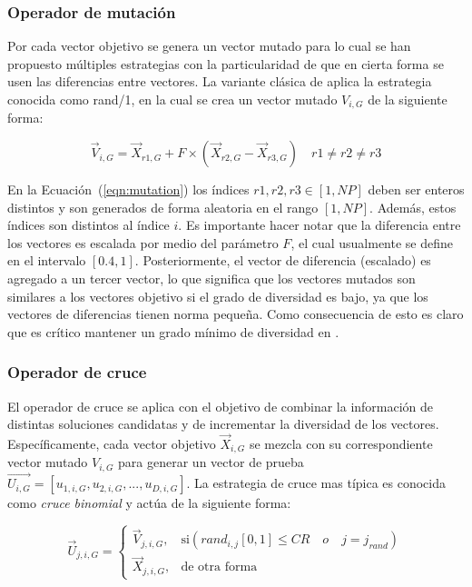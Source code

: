 \subsubsection{Operador de mutación}

Por cada vector objetivo se genera un vector mutado para lo cual se han propuesto múltiples estrategias con la particularidad de que en cierta forma
se usen las diferencias entre vectores.
%
La variante clásica de \DE{} aplica la estrategia conocida como rand/1, en la cual se crea un vector mutado $V_{i,G}$ de la siguiente forma:

\begin{equation}\label{eqn:mutation}
\vec{V}_{i,G} = \vec{X}_{r1, G} + F \times (\vec{X}_{r2, G} - \vec{X}_{r3, G}) \quad r1 \neq r2 \neq r3
\end{equation}

En la Ecuación~(\ref{eqn:mutation}) los índices $r1, r2, r3 \in [1,NP]$ deben ser enteros distintos y son generados de forma aleatoria
en el rango $[1, NP]$.
%
Además, estos índices son distintos al índice $i$.
%
Es importante hacer notar que la diferencia entre los vectores es escalada por medio del parámetro $F$, el cual usualmente se define en el intervalo $[0.4, 1]$.
%
Posteriormente, el vector de diferencia (escalado) es agregado a un tercer vector, lo que significa que
los vectores mutados son similares a los vectores objetivo si el grado de diversidad es bajo, ya que los vectores de diferencias tienen norma pequeña.
%
Como consecuencia de esto es claro que es crítico mantener un grado mínimo de diversidad en \DE{}.

\subsubsection{Operador de cruce}

El operador de cruce se aplica con el objetivo de combinar la información de distintas soluciones candidatas y de incrementar la diversidad de los vectores.
%
Específicamente, cada vector objetivo $\vec{X}_{i,G}$ se mezcla con su correspondiente vector mutado $V_{i,G}$ para generar un vector de 
prueba $\vec{U_{i,G}} = [u_{1,i,G},u_{2,i,G}, ..., u_{D,i,G} ]$.
%
La estrategia de cruce mas típica es conocida como \textit{cruce binomial} y actúa de la siguiente forma:

\begin{equation} \label{eqn:crossover}
\vec{U}_{j,i,G}= 
\begin{cases}
    \vec{V}_{j,i,G},& \text{si} (rand_{i,j}[0,1] \leq CR \quad o \quad j = j_{rand}  )\\
    \vec{X}_{j,i,G},              & \text{de otra forma}
\end{cases}
\end{equation}

